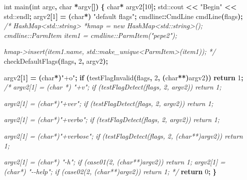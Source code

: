 \documentclass[
]{book}
\newenvironment{Shaded}{\begin{snugshade}}{\end{snugshade}}
\newcommand{\BuiltInTok}[1]{#1}
\newcommand{\CommentTok}[1]{\textcolor[rgb]{0.56,0.35,0.01}{\textit{#1}}}
\newcommand{\ControlFlowTok}[1]{\textcolor[rgb]{0.13,0.29,0.53}{\textbf{#1}}}
\newcommand{\DataTypeTok}[1]{\textcolor[rgb]{0.13,0.29,0.53}{#1}}
\newcommand{\DecValTok}[1]{\textcolor[rgb]{0.00,0.00,0.81}{#1}}
\newcommand{\NormalTok}[1]{#1}
\newcommand{\OperatorTok}[1]{\textcolor[rgb]{0.81,0.36,0.00}{\textbf{#1}}}
\newcommand{\StringTok}[1]{\textcolor[rgb]{0.31,0.60,0.02}{#1}}
\begin{document}
\begin{Shaded}
\begin{Highlighting}[]
\DataTypeTok{int}\NormalTok{ main}\OperatorTok{(}\DataTypeTok{int}\NormalTok{ argc}\OperatorTok{,} \DataTypeTok{char} \OperatorTok{*}\NormalTok{argv}\OperatorTok{[])} \OperatorTok{\{}
    \DataTypeTok{char}\OperatorTok{*}\NormalTok{ argv2}\OperatorTok{[}\DecValTok{10}\OperatorTok{];}
    \BuiltInTok{std::}\NormalTok{cout}\OperatorTok{ \textless{}\textless{}} \StringTok{"Begin"} \OperatorTok{\textless{}\textless{}} \BuiltInTok{std::}\NormalTok{endl}\OperatorTok{;}
\NormalTok{    argv2}\OperatorTok{[}\DecValTok{1}\OperatorTok{]} \OperatorTok{=} \OperatorTok{(}\DataTypeTok{char}\OperatorTok{*)} \StringTok{"default flags"}\OperatorTok{;}
\NormalTok{    cmdline}\OperatorTok{::}\NormalTok{CmdLine cmdLine}\OperatorTok{(}\NormalTok{flags}\OperatorTok{);}
    \CommentTok{/*}
\CommentTok{    HashMap\textless{}std::string\textgreater{} *hmap = new HashMap\textless{}std::string\textgreater{}();}
\CommentTok{    cmdline::ParmItem item1 = cmdline::ParmItem("pepe2");}

\CommentTok{    hmap{-}\textgreater{}insert(item1.name, std::make\_unique\textless{}ParmItem\textgreater{}(item1));}
\CommentTok{    */}
\NormalTok{    checkDefaultFlags}\OperatorTok{(}\NormalTok{flags}\OperatorTok{,} \DecValTok{2}\OperatorTok{,}\NormalTok{ argv2}\OperatorTok{);}

\NormalTok{    argv2}\OperatorTok{[}\DecValTok{1}\OperatorTok{]} \OperatorTok{=} \OperatorTok{(}\DataTypeTok{char}\OperatorTok{*)}\StringTok{"+o"}\OperatorTok{;}
    \ControlFlowTok{if} \OperatorTok{(}\NormalTok{testFlagInvalid}\OperatorTok{(}\NormalTok{flags}\OperatorTok{,} \DecValTok{2}\OperatorTok{,} \OperatorTok{(}\DataTypeTok{char}\OperatorTok{**)}\NormalTok{argv2}\OperatorTok{))} \ControlFlowTok{return} \DecValTok{1}\OperatorTok{;}
\CommentTok{/*}
\CommentTok{    argv2[1] = (char *)  "+v";}
\CommentTok{    if (testFlagDetect(flags, 2, argv2)) return 1;}

\CommentTok{    argv2[1] = (char*)"+ver";}
\CommentTok{    if (testFlagDetect(flags, 2, argv2)) return 1;}

\CommentTok{    argv2[1] = (char*)"+verbo";}
\CommentTok{    if (testFlagDetect(flags, 2, argv2)) return 1;}

\CommentTok{    argv2[1] = (char*)"+verbose";}
\CommentTok{    if (testFlagDetect(flags, 2, (char**)argv2)) return 1;}


\CommentTok{    argv2[1] = (char*) "{-}h";}
\CommentTok{    if (case01(2, (char**)argv2)) return 1;}
\CommentTok{    argv2[1] = (char*) "{-}{-}help";}
\CommentTok{    if (case02(2, (char**)argv2)) return 1;}
\CommentTok{    */}
    \ControlFlowTok{return} \DecValTok{0}\OperatorTok{;}
\OperatorTok{\}}
\end{Highlighting}
\end{Shaded}
\end{document}

